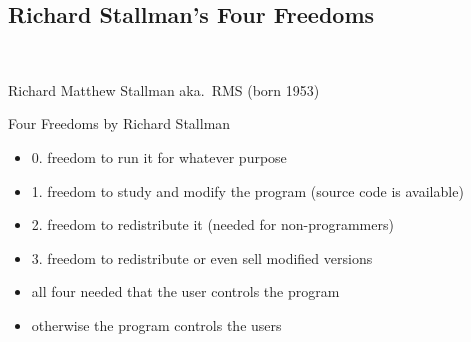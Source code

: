 
\subsection{Richard Stallman's Four Freedoms}
\begin{frame}{\insertsubsection\ }
	\begin{fancycolumns}
		\centering{}
		\vspace{-7mm}
		
		\begin{note}{}
			Richard Matthew Stallman aka.\ RMS (born 1953)
		\end{note}
		\nextcolumn
		\begin{definition}{Four Freedoms by Richard Stallman}
			\begin{itemize}
				\item 0. freedom to run it for whatever purpose
				\item 1. freedom to study and modify the program (source code is available)
				\item 2. freedom to redistribute it (needed for non-programmers)
				\item 3. freedom to redistribute or even sell modified versions
				\item all four needed that the user controls the program
				\item otherwise the program controls the users
			\end{itemize}
		\end{definition}
	\end{fancycolumns}
\end{frame}

